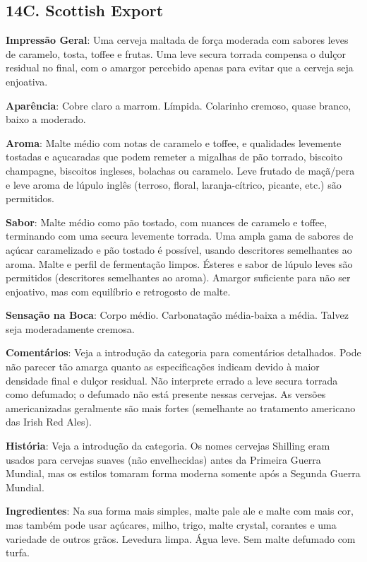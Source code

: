 \subsection*{14C. Scottish Export}

\textbf{Impressão Geral}: Uma cerveja maltada de força moderada com sabores leves de caramelo, tosta, toffee e frutas. Uma leve secura torrada compensa o dulçor residual no final, com o amargor percebido apenas para evitar que a cerveja seja enjoativa.

\textbf{Aparência}: Cobre claro a marrom. Límpida. Colarinho cremoso, quase branco, baixo a moderado.

\textbf{Aroma}: Malte médio com notas de caramelo e toffee, e qualidades levemente tostadas e açucaradas que podem remeter a migalhas de pão torrado, biscoito champagne, biscoitos ingleses, bolachas ou caramelo. Leve frutado de maçã/pera e leve aroma de lúpulo inglês (terroso, floral, laranja-cítrico, picante, etc.) são permitidos.

\textbf{Sabor}: Malte médio como pão tostado, com nuances de caramelo e toffee, terminando com uma secura levemente torrada. Uma ampla gama de sabores de açúcar caramelizado e pão tostado é possível, usando descritores semelhantes ao aroma. Malte e perfil de fermentação limpos. Ésteres e sabor de lúpulo leves são permitidos (descritores semelhantes ao aroma). Amargor suficiente para não ser enjoativo, mas com equilíbrio e retrogosto de malte.

\textbf{Sensação na Boca}: Corpo médio. Carbonatação média-baixa a média. Talvez seja moderadamente cremosa.

\textbf{Comentários}: Veja a introdução da categoria para comentários detalhados. Pode não parecer tão amarga quanto as especificações indicam devido à maior densidade final e dulçor residual. Não interprete errado a leve secura torrada como defumado; o defumado não está presente nessas cervejas. As versões americanizadas geralmente são mais fortes (semelhante ao tratamento americano das Irish Red Ales).

\textbf{História}: Veja a introdução da categoria. Os nomes cervejas Shilling eram usados para cervejas suaves (não envelhecidas) antes da Primeira Guerra Mundial, mas os estilos tomaram forma moderna somente após a Segunda Guerra Mundial.

\textbf{Ingredientes}: Na sua forma mais simples, malte pale ale e malte com mais cor, mas também pode usar açúcares, milho, trigo, malte crystal, corantes e uma variedade de outros grãos. Levedura limpa. Água leve. Sem malte defumado com turfa.

